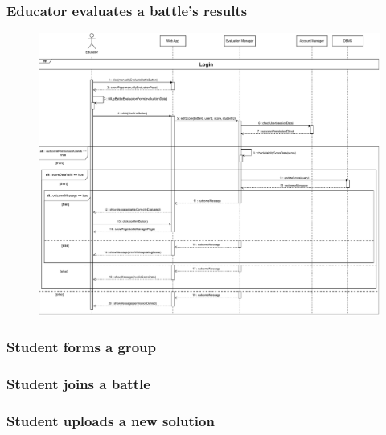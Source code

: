 \documentclass{article}
\begin{document}
{    \subsubsection{Educator evaluates a battle's results}
        \begin{figure}[H]
            \centering
            \hspace*{-3.1cm}\includegraphics[scale=0.55]{Sequence/Sequence8DD.pdf}
            \caption{}
            \label{fig:Sequence8DD}
        \end{figure}
        
    \subsubsection{Student forms a group}
        \begin{figure}[H]
            \centering
            \caption{}
            \label{fig:}
        \end{figure}
    \subsubsection{Student joins a battle}
        \begin{figure}[H]
            \centering
            \caption{}
            \label{fig:}
        \end{figure}
    \subsubsection{Student uploads a new solution}
        \begin{figure}[H]
            \centering
            \caption{}
            \label{fig:}
        \end{figure}
}
\end{document}
